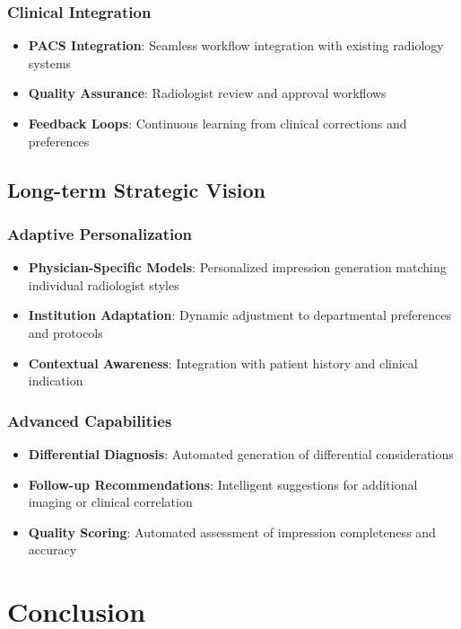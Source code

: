 \documentclass[11pt,letterpaper]{article}
\begin{document}
\subsubsection{Clinical Integration}
\begin{itemize}
    \item \textbf{PACS Integration}: Seamless workflow integration with existing radiology systems
    \item \textbf{Quality Assurance}: Radiologist review and approval workflows
    \item \textbf{Feedback Loops}: Continuous learning from clinical corrections and preferences
\end{itemize}

\subsection{Long-term Strategic Vision}

\subsubsection{Adaptive Personalization}
\begin{itemize}
    \item \textbf{Physician-Specific Models}: Personalized impression generation matching individual radiologist styles
    \item \textbf{Institution Adaptation}: Dynamic adjustment to departmental preferences and protocols
    \item \textbf{Contextual Awareness}: Integration with patient history and clinical indication
\end{itemize}

\subsubsection{Advanced Capabilities}
\begin{itemize}
    \item \textbf{Differential Diagnosis}: Automated generation of differential considerations
    \item \textbf{Follow-up Recommendations}: Intelligent suggestions for additional imaging or clinical correlation
    \item \textbf{Quality Scoring}: Automated assessment of impression completeness and accuracy
\end{itemize}

\section{Conclusion}
\end{document}
